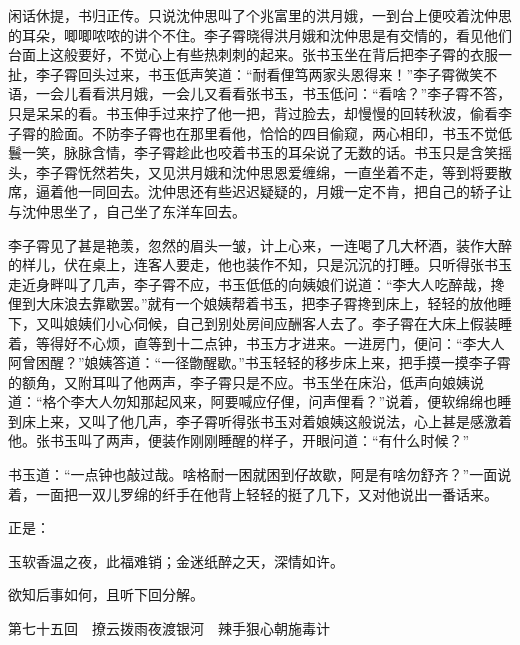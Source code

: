 \documentclass[12pt,UTF8]{ctexbook}
\begin{document}
{{{闲话休提，书归正传。只说沈仲思叫了个兆富里的洪月娥，一到台上便咬着沈仲思的耳朵，唧唧哝哝的讲个不住。李子霄晓得洪月娥和沈仲思是有交情的，看见他们台面上这般要好，不觉心上有些热刺刺的起来。张书玉坐在背后把李子霄的衣服一扯，李子霄回头过来，书玉低声笑道：“耐看俚笃两家头恩得来！”李子霄微笑不语，一会儿看看洪月娥，一会儿又看看张书玉，书玉低问：“看啥？”李子霄不答，只是呆呆的看。书玉伸手过来拧了他一把，背过脸去，却慢慢的回转秋波，偷看李子霄的脸面。不防李子霄也在那里看他，恰恰的四目偷窥，两心相印，书玉不觉低鬟一笑，脉脉含情，李子霄趁此也咬着书玉的耳朵说了无数的话。书玉只是含笑摇头，李子霄怃然若失，又见洪月娥和沈仲思恩爱缠绵，一直坐着不走，等到将要散席，逼着他一同回去。沈仲思还有些迟迟疑疑的，月娥一定不肯，把自己的轿子让与沈仲思坐了，自己坐了东洋车回去。

李子霄见了甚是艳羡，忽然的眉头一皱，计上心来，一连喝了几大杯酒，装作大醉的样儿，伏在桌上，连客人要走，他也装作不知，只是沉沉的打睡。只听得张书玉走近身畔叫了几声，李子霄不应，书玉低低的向姨娘们说道：“李大人吃醉哉，搀俚到大床浪去靠歇罢。”就有一个娘姨帮着书玉，把李子霄搀到床上，轻轻的放他睡下，又叫娘姨们小心伺候，自己到别处房间应酬客人去了。李子霄在大床上假装睡着，等得好不心烦，直等到十二点钟，书玉方才进来。一进房门，便问：“李大人阿曾困醒？”娘姨答道：“一径朆醒歇。”书玉轻轻的移步床上来，把手摸一摸李子霄的额角，又附耳叫了他两声，李子霄只是不应。书玉坐在床沿，低声向娘姨说道：“格个李大人勿知那起风来，阿要喊应仔俚，问声俚看？”说着，便软绵绵也睡到床上来，又叫了他几声，李子霄听得张书玉对着娘姨这般说法，心上甚是感激着他。张书玉叫了两声，便装作刚刚睡醒的样子，开眼问道：“有什么时候？”

书玉道：“一点钟也敲过哉。啥格耐一困就困到仔故歇，阿是有啥勿舒齐？”一面说着，一面把一双儿罗绵的纤手在他背上轻轻的挺了几下，又对他说出一番话来。

正是：

玉软香温之夜，此福难销；金迷纸醉之天，深情如许。

欲知后事如何，且听下回分解。





第七十五回　撩云拨雨夜渡银河　辣手狠心朝施毒计





}}}
\end{document}
